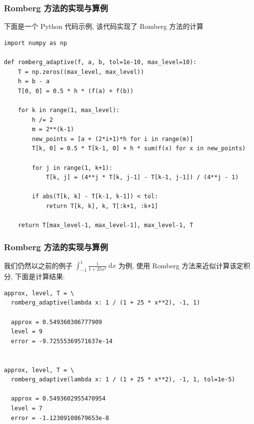 
\begin{frame}[fragile]
\frametitle{Romberg 方法的实现与算例}

下面是一个 Python 代码示例, 该代码实现了 Romberg 方法的计算

\begin{lstlisting}
import numpy as np

def romberg_adaptive(f, a, b, tol=1e-10, max_level=10):
    T = np.zeros((max_level, max_level))
    h = b - a
    T[0, 0] = 0.5 * h * (f(a) + f(b))

    for k in range(1, max_level):
        h /= 2
        m = 2**(k-1)
        new_points = [a + (2*i+1)*h for i in range(m)]
        T[k, 0] = 0.5 * T[k-1, 0] + h * sum(f(x) for x in new_points)

        for j in range(1, k+1):
            T[k, j] = (4**j * T[k, j-1] - T[k-1, j-1]) / (4**j - 1)

        if abs(T[k, k] - T[k-1, k-1]) < tol:
            return T[k, k], k, T[:k+1, :k+1]

    return T[max_level-1, max_level-1], max_level-1, T
\end{lstlisting}

\end{frame}


\begin{frame}[fragile]
\frametitle{Romberg 方法的实现与算例}

我们仍然以之前的例子 $\int_{-1}^1 \frac{1}{1+ 25x^2} ~ \mathrm{d}x$ 为例, 使用 Romberg 方法来近似计算该定积分, 下面是计算结果:

\vspace{0.5em}

\begin{lstlisting}[numbers=none,keywordstyle=\color{black}]
approx, level, T = \
  romberg_adaptive(lambda x: 1 / (1 + 25 * x**2), -1, 1)

  approx = 0.549360306777909
  level = 9
  error = -9.72555369571637e-14


approx, level, T = \
  romberg_adaptive(lambda x: 1 / (1 + 25 * x**2), -1, 1, tol=1e-5)

  approx = 0.5493602955470954
  level = 7
  error = -1.12309108679653e-8
\end{lstlisting}

\end{frame}

